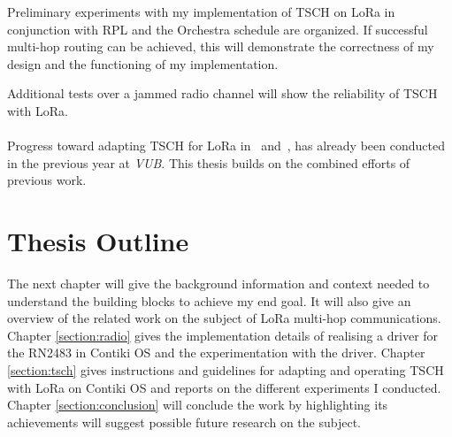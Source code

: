 Preliminary experiments with my implementation of TSCH on LoRa in conjunction
with RPL and the Orchestra schedule are organized. If successful multi-hop routing
can be achieved, this will demonstrate the correctness of my design and the functioning
of my implementation.

Additional tests over a jammed radio channel will show the reliability of
TSCH with LoRa.

\paragraph{}

Progress toward adapting TSCH for LoRa in~\cite{8847137} and~\cite{njomgang_2018},
has already been conducted in the previous year at \emph{VUB}.
This thesis builds on the combined efforts of previous work.

\section{Thesis Outline}

The next chapter will give the background information and context needed to
understand the building blocks to achieve my end goal.
It will also give an overview of the related work on the subject of
LoRa multi-hop communications.
Chapter \ref{section:radio} gives the implementation details of realising a driver for the
RN2483 in Contiki OS and the experimentation with the driver.
Chapter \ref{section:tsch} gives instructions and guidelines for adapting and
operating TSCH with LoRa on Contiki OS and reports on the different experiments I conducted.
Chapter \ref{section:conclusion} will conclude the work by highlighting its
achievements will suggest possible future research on the subject.
